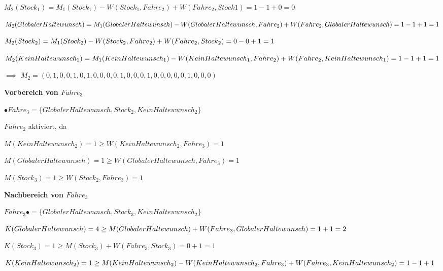 \documentclass{scrreprt}
\begin{document}
\begin{enumerate}
\begin{addmargin}[1cm]{0cm}
  $M_2(Stock_1) = M_1(Stock_1) - W(Stock_1, Fahre_2) + W(Fahre_2, Stock1) = 1 - 1 + 0 = 0$

  $M_2(GlobalerHaltewunsch) = M_1(GlobalerHaltewunsch) - \\ W(GlobalerHaltewunsch, Fahre_2) + \\ W(Fahre_2, GlobalerHaltewunsch) = 1 - 1 + 1 = 1$

  $M_2(Stock_2) = M_1(Stock_2) - W(Stock_2, Fahre_2) + \\ W(Fahre_2, Stock_2) = 0 - 0 + 1 = 1$

  $M_2(KeinHaltewunsch_1) = M_1(KeinHaltewunsch_1) - \\ W(KeinHaltewunsch_1, Fahre_2) + \\ W(Fahre_2, KeinHaltewunsch_1) = 1 - 1 + 1 = 1$

  $\implies$ 
  $M_2 = (
  0, 1, 0, 0, 1, 
  0, 1, 0, 0, 0, 
  0, 1, 0, 0, 0, 
  1, 0, 0, 0, 0, 
  0, 1, 0, 0, 0
  )$
\end{addmargin}


\textbf{Vorbereich von $Fahre_3$}

\begin{addmargin}[1cm]{0cm}
  $\bullet Fahre_3 = \{ GlobalerHaltewunsch, Stock_2, KeinHaltewunsch_2 \}$

  $Fahre_2$ aktiviert, da

  $M(KeinHaltewunsch_2) = 1 \geq W(KeinHaltewunsch_2, Fahre_3) = 1$  

  $M(GlobalerHaltewunsch) = 1 \geq W(GlobalerHaltewunsch, Fahre_3) = 1$

  $M(Stock_3) = 1 \geq W(Stock_2, Fahre_3) = 1$
\end{addmargin}

\textbf{Nachbereich von $Fahre_3$}

\begin{addmargin}[1cm]{0cm}
  $Fahre_3 \bullet = \{ GlobalerHaltewunsch, Stock_3, KeinHaltewunsch_2 \}$

  $K(GlobalerHaltewunsch) = 4 \geq M(GlobalerHaltewunsch) + \\ W(Fahre_3, GlobalerHaltewunsch) = 1 + 1 = 2$ 

  $K(Stock_3) = 1 \geq M(Stock_3) + W(Fahre_3, Stock_3) = 0 + 1 = 1$

  $K(KeinHaltewunsch_2) = 1 \geq M(KeinHaltewunsch_2) - \\ W(KeinHaltewunsch_2, Fahre_3) + \\ W(Fahre_3, KeinHaltewunsch_2) = 1 - 1 + 1$


\end{addmargin}
\end{enumerate}
\end{document}
